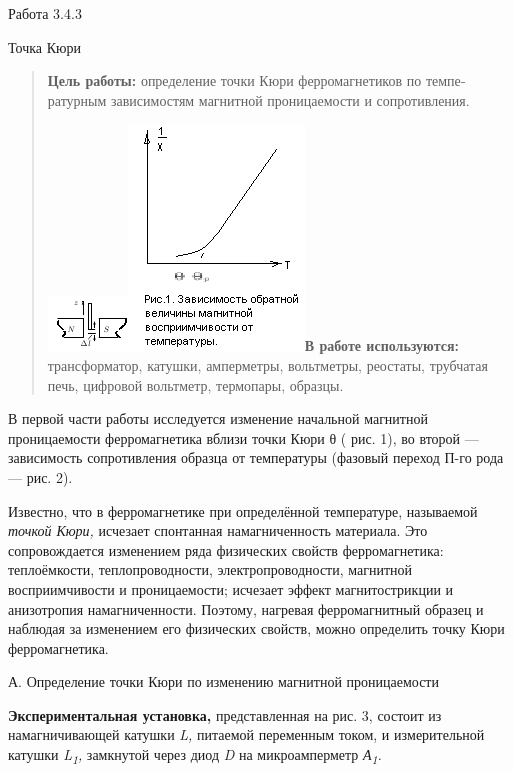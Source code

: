 \documentclass[]{article}
\date{}
\begin{document}
Работа 3.4.3

Точка Кюри

\begin{quote}
\textbf{Цель работы:} определение точки Кюри ферромагнетиков по
темпе­ратурным зависимостям магнитной проницаемости и сопротивления.

\includegraphics{./media/image1.png}\includegraphics{./media/image2.png}\textbf{В
работе используются:} трансформатор, катушки, амперметры, вольтметры,
реостаты, трубчатая печь, цифровой вольтметр, термо­пары, образцы.
\end{quote}

В первой части работы исследуется изменение начальной магнитной
проницаемости ферромагнетика вблизи точки Кюри θ ( рис. 1), во второй
--- зависимость сопротивления образца от температуры (фазовый переход
П-го рода --- рис. 2).

Известно, что в ферромагнетике при определённой температуре, на­зываемой
\emph{точкой Кюри,} исчезает спонтанная намагниченность матери­ала. Это
сопровождается изменением ряда физических свойств ферро­магнетика:
теплоёмкости, теплопроводности, электропроводности, маг­нитной
восприимчивости и проницаемости; исчезает эффект магнитострикции и
анизотропия намагниченности. Поэтому, нагревая ферромагнитный образец и
наблюдая за изменением его физических свойств, можно определить точку
Кюри ферромагнетика.

А. Определение точки Кюри по изменению магнитной проницаемости

\textbf{Экспериментальная установка,} представленная на рис. 3, состоит
из намагничивающей катушки \emph{L,} питаемой переменным током, и
из­мерительной катушки \emph{L\textsubscript{1},} замкнутой через диод
\emph{D} на микроамперметр \emph{А\textsubscript{1}.}
\end{document}
